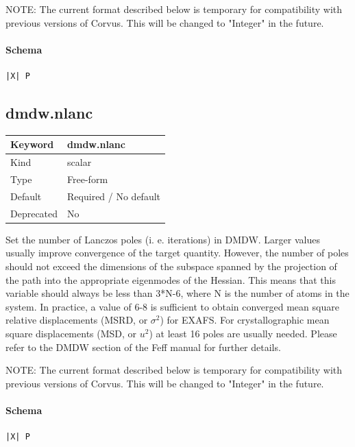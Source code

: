 \documentclass[11pt]{article}
\begin{document}
 NOTE: The current format described below is temporary for compatibility with
 previous versions of Corvus. This will be changed to "Integer" in the future.

\paragraph{Schema}
\begin{Verbatim}
|X| P
\end{Verbatim}

\subsection{dmdw.nlanc}
\label{kw:dmdw-nlanc}
\begin{longtable}{|p{1.5in}|p{4.5in}|}
\hline
Keyword & dmdw.nlanc \\
\hline
Kind & scalar \\
\hline
Type & Free-form \\
\hline
Default & Required / No default \\
\hline
Deprecated & No \\
\hline
\end{longtable}
 Set the number of Lanczos poles (i. e. iterations) in DMDW. Larger values
 usually improve convergence of the target quantity. However, the number of
 poles should not exceed the dimensions of the subspace spanned by the
 projection of the path into the appropriate eigenmodes of the Hessian. This
 means that this variable should always be less than 3*N-6, where N is the
 number of atoms in the system. In practice, a value of 6-8 is sufficient to
 obtain converged mean square relative displacements (MSRD, or $\sigma^2$) for EXAFS.
 For crystallographic mean square displacements (MSD, or $u^2$) at least 16 poles
 are usually needed. Please refer to the DMDW section of the Feff manual for
 further details.

 NOTE: The current format described below is temporary for compatibility with
 previous versions of Corvus. This will be changed to "Integer" in the future.

\paragraph{Schema}
\begin{Verbatim}
|X| P
\end{Verbatim}
\end{document}
